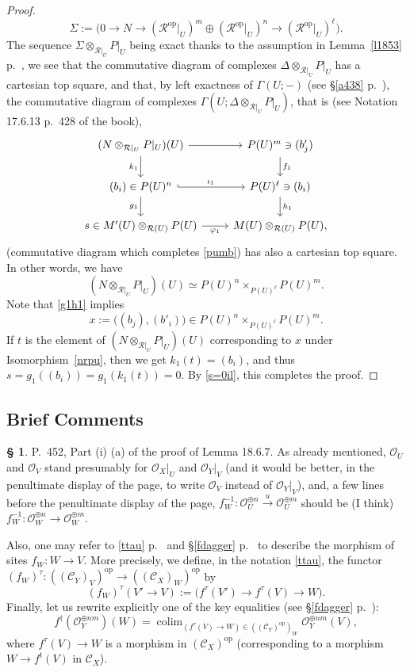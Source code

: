 \documentclass[12pt]{article}
\theoremstyle{remark}
\theoremstyle{definition}
\newtheorem{s}[thm]{\S}
\newcommand{\cc}{\mathcal}
\newcommand{\C}{\mathcal C}
\newcommand{\pp}{\varphi}
\newcommand{\xr}{\xrightarrow}
\DeclareMathOperator*{\colim}{colim}
\DeclareMathOperator{\op}{op}
\begin{document}
\begin{proof}
%
\begin{equation}\label{tsc2}
\Sigma:=\Big(0\to N\to(\cc R^{\op}|_U)^m\oplus(\cc R^{\op}|_U)^n\to(\cc R^{\op}|_U)^\ell\Big).
\end{equation}
% 
The sequence $\Sigma\otimes_{\cc R|_U}P|_U$ being exact thanks to the assumption in Lemma~\ref{l1853} p.~\pageref{l1853}, we see that the commutative diagram of complexes $\Delta\otimes_{\cc R|_U}P|_U$ has a cartesian top square, and that, by left exactness of $\Gamma(U;-)$ (see \S\ref{a438} p.~\pageref{a438}), the commutative diagram of complexes $\Gamma(U;\Delta\otimes_{\cc R|_U}P|_U)$, that is (see Notation 17.6.13 p.~428 of the book), 
$$
\begin{tikzcd}
(N\otimes_{\cc R|_U}P|_U)(U)\ar{r}\ar{d}[swap]{k_1}&P(U)^m\ar{d}{f_1}\ni(b'_j)\\ 
(b_i)\in P(U)^n\ar[hook]{r}{\iota_1}\ar{d}[swap]{g_1}&P(U)^\ell\ni(b_i)\ar{d}{h_1}\\ 
s\in M'(U)\otimes_{\cc R(U)}P(U)\ar{r}[swap]{\pp_1}&M(U)\otimes_{\cc R(U)}P(U),
\end{tikzcd}
$$ 
(commutative diagram which completes \eqref{pumb}) has also a cartesian top square. In other words, we have 
%
\begin{equation}\label{nrpu}
(N\otimes_{\cc R|_U}P|_U)(U)\simeq P(U)^n\times_{P(U)^\ell}P(U)^m.
\end{equation}
% 
Note that \eqref{g1h1} implies 
$$
x:=\big((b_j),(b'_i)\big)\in P(U)^n\times_{P(U)^\ell}P(U)^m.
$$ 
If $t$ is the element of $(N\otimes_{\cc R|_U}P|_U)(U)$ corresponding to $x$ under Isomorphism~\eqref{nrpu}, then we get $k_1(t)=(b_i)$, and thus $s=g_1((b_i))=g_1(k_1(t))=0$. By \eqref{s=0il}, this completes the proof.  
\end{proof}


\subsection{Brief Comments} 

\begin{s}
P.~452, Part (i) (a) of the proof of Lemma 18.6.7. As already mentioned, $\cc O_U$ and $\cc O_V$ stand presumably for $\cc O_X|_U$ and $\cc O_Y|_V$ (and it would be better, in the penultimate display of the page, to write $\cc O_V$ instead of $\cc O_Y|_V$), and, a few lines before the penultimate display of the page, $f_W^{-1}:\cc O_U^{\oplus n}\xr u\cc O_U^{\oplus m}$ should be (I think) $f_W^{-1}:\cc O_W^{\oplus n}\to\cc O_W^{\oplus m}$. 

Also, one may refer to \eqref{ttau} p.~\pageref{ttau} and \S\ref{fdagger} p.~\pageref{fdagger} to describe the morphism of sites $f_W:W\to V$. More precisely, we define, in the notation \eqref{ttau}, the functor $(f_W)^\tau:((\C_Y)_V)^{\op}\to((\C_X)_W)^{\op}$ by
$$
(f_W)^\tau(V'\to V):=\big(f^\tau(V')\to f^\tau(V)\to W\big).
$$
Finally, let us rewrite explicitly one of the key equalities (see \S\ref{fdagger} p.~\pageref{fdagger}): 
$$
f^\dagger(\cc O_Y^{\oplus nm})(W)=\colim_{(f^\tau(V)\to W)\in((\C_Y)^{\op})_W}\cc O_Y^{\oplus nm}(V),
$$ 
where $f^\tau(V)\to W$ is a morphism in $(\C_X)^{\op}$ (corresponding to a morphism $W\to f^t(V)$ in $\C_X$).
\end{s}
\printindex
\end{document}

